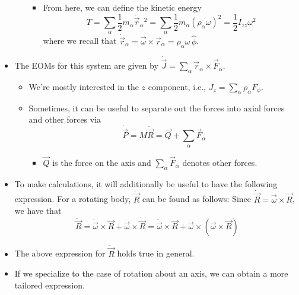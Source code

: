 \documentclass[../notes.tex]{subfiles}
\begin{document}
\begin{itemize}
\begin{itemize}
\begin{itemize}
            \item From here, we can define the kinetic energy
            \begin{equation*}
                T = \sum_\alpha\frac{1}{2}m_\alpha\dot{\vec{r}}_\alpha{}^2
                = \sum_\alpha\frac{1}{2}m_\alpha(\rho_\alpha\omega)^2
                = \frac{1}{2}I_{zz}\omega^2
            \end{equation*}
            where we recall that $\dot{\vec{r}}_\alpha=\vec{\omega}\times\vec{r}_\alpha=\rho_\alpha\omega\,\hat{\phi}$.
        \end{itemize}
    \end{itemize}
    \item The EOMs for this system are given by $\dot{\vec{J}}=\sum_\alpha\vec{r}_\alpha\times\vec{F}_\alpha$.
    \begin{itemize}
        \item We're mostly interested in the $z$ component, i.e., $\dot{J}_z=\sum_\alpha\rho_\alpha F_\phi$.
        \item Sometimes, it can be useful to separate out the forces into axial forces and other forces via
        \begin{equation*}
            \dot{\vec{P}} = M\ddot{\vec{R}}
            = \vec{Q}+\sum_\alpha\vec{F}_\alpha
        \end{equation*}
        \begin{itemize}
            \item $\vec{Q}$ is the force on the axis and $\sum_\alpha\vec{F}_\alpha$ denotes other forces.
        \end{itemize}
    \end{itemize}
    \item To make calculations, it will additionally be useful to have the following expression. For a rotating body, $\ddot{\vec{R}}$ can be found as follows: Since $\dot{\vec{R}}=\vec{\omega}\times\vec{R}$, we have that
    \begin{equation*}
        \ddot{\vec{R}} = \dot{\vec{\omega}}\times\vec{R}+\vec{\omega}\times\dot{\vec{R}}
        = \dot{\vec{\omega}}\times\vec{R}+\vec{\omega}\times(\vec{\omega}\times\vec{R})
    \end{equation*}
    \item The above expression for $\ddot{\vec{R}}$ holds true in general.
    \item If we specialize to the case of rotation about an axis, we can obtain a more tailored expression.
    \begin{itemize}

\end{itemize}
\end{itemize}
\end{document}
